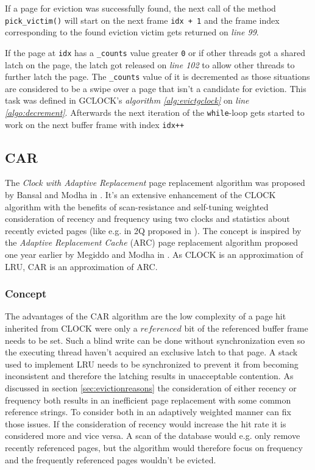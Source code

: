 	If a page for eviction was successfully found, the next call of the method \lstinline{pick_victim()} will start on the next frame \lstinline{idx + 1} and the frame index corresponding to the found eviction victim gets returned on \emph{line 99}.
	
	If the page at \lstinline{idx} has a \lstinline{_counts} value greater \lstinline{0} or if other threads got a shared latch on the page, the latch got released on \emph{line 102} to allow other threads to further latch the page. The \lstinline{_counts} value of it is decremented as those situations are considered to be a swipe over a page that isn't a candidate for eviction. This task was defined in GCLOCK's \emph{algorithm \ref{alg:evictgclock}} on \emph{line \ref{algo:decrement}}. Afterwards the next iteration of the \lstinline{while}-loop gets started to work on the next buffer frame with index \lstinline{idx++}

\subsection{CAR}

	The \emph{Clock with Adaptive Replacement} page replacement algorithm was proposed by Bansal and Modha in \cite{Bansal:2004}. It's an extensive enhancement of the CLOCK algorithm with the benefits of scan-resistance and self-tuning weighted consideration of recency and frequency using two clocks and statistics about recently evicted pages (like e.g. in 2Q proposed in \cite{Johnson:1994}). The concept is inspired by the \emph{Adaptive Replacement Cache} (ARC) page replacement algorithm proposed one year earlier by Megiddo and Modha in \cite{Megiddo:2003}. As CLOCK is an approximation of LRU, CAR is an approximation of ARC.

\subsubsection{Concept}

		The advantages of the CAR algorithm are the low complexity of a page hit inherited from CLOCK were only a $referenced$ bit of the referenced buffer frame needs to be set. Such a blind write can be done without synchronization even so the executing thread haven't acquired an exclusive latch to that page. A stack used to implement LRU needs to be synchronized to prevent it from becoming inconsistent and therefore the latching results in unacceptable contention. As discussed in section \ref{sec:evictionreasons} the consideration of either recency or frequency both results in an inefficient page replacement with some common reference strings. To consider both in an adaptively weighted manner can fix those issues. If the consideration of recency would increase the hit rate it is considered more and vice versa. A scan of the database would e.g. only remove recently referenced pages, but the algorithm would therefore focus on frequency and the frequently referenced pages wouldn't be evicted.


